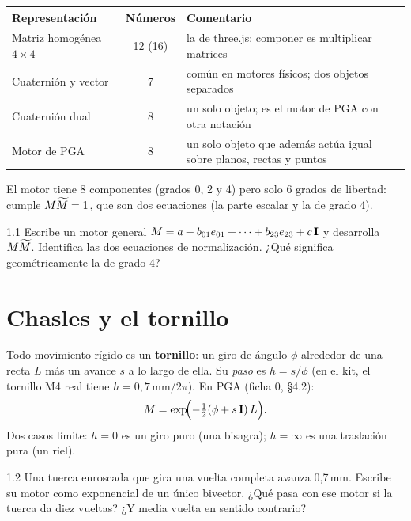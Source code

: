 \documentclass[11pt,a4paper]{article}
\begin{document}
\begin{tabularx}{\linewidth}{@{}l c Y@{}}
\toprule
\textbf{Representación} & \textbf{Números} & \textbf{Comentario}\\
\midrule
Matriz homogénea $4\times4$ & 12 (16) & la de three.js; componer es multiplicar matrices\\
Cuaternión y vector & 7 & común en motores físicos; dos objetos separados\\
Cuaternión dual & 8 & un solo objeto; es el motor de PGA con otra notación\\
Motor de PGA & 8 & un solo objeto que además actúa igual sobre planos, rectas y puntos\\
\bottomrule
\end{tabularx}

\medskip
El motor tiene 8 componentes (grados 0, 2 y 4) pero solo 6 grados de libertad: cumple $M\widetilde{M} = 1$, que son dos
ecuaciones (la parte escalar y la de grado 4).

\begin{ejercicio}{1.1}
Escribe un motor general $M = a + b_{01}e_{01} + \dots + b_{23}e_{23} + c\,\mathbf{I}$ y desarrolla $M\widetilde{M}$. Identifica las
dos ecuaciones de normalización. ¿Qué significa geométricamente la de grado 4?
\end{ejercicio}

\section{Chasles y el tornillo}

Todo movimiento rígido es un \textbf{tornillo}: un giro de ángulo $\phi$ alrededor de una recta $L$ más un avance $s$ a
lo largo de ella. Su \emph{paso} es $h = s/\phi$ (en el kit, el tornillo M4 real tiene $h = 0{,}7\,\mathrm{mm}/2\pi$).
En PGA (ficha 0, §4.2):
\begin{equation}
  M = \exp\!\Bigl(-\tfrac12(\phi + s\,\mathbf{I})\,L\Bigr).
\end{equation}
Dos casos límite: $h = 0$ es un giro puro (una bisagra); $h = \infty$ es una traslación pura (un riel).

\begin{ejercicio}{1.2}
Una tuerca enroscada que gira una vuelta completa avanza 0{,}7\,mm. Escribe su motor como exponencial de un único
bivector. ¿Qué pasa con ese motor si la tuerca da diez vueltas? ¿Y media vuelta en sentido contrario?
\end{ejercicio}
\end{document}

